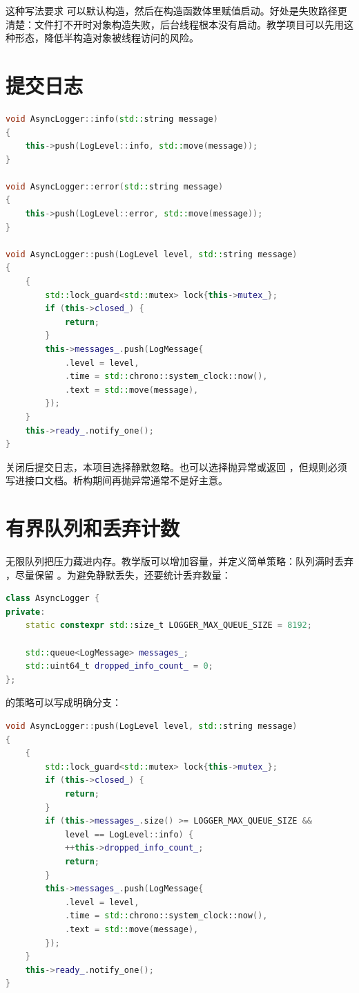 这种写法要求  可以默认构造，然后在构造函数体里赋值启动。好处是失败路径更清楚：文件打不开时对象构造失败，后台线程根本没有启动。教学项目可以先用这种形态，降低半构造对象被线程访问的风险。

\section{提交日志}

\begin{lstlisting}[language=C++,caption={提交日志消息}]
void AsyncLogger::info(std::string message)
{
    this->push(LogLevel::info, std::move(message));
}

void AsyncLogger::error(std::string message)
{
    this->push(LogLevel::error, std::move(message));
}

void AsyncLogger::push(LogLevel level, std::string message)
{
    {
        std::lock_guard<std::mutex> lock{this->mutex_};
        if (this->closed_) {
            return;
        }
        this->messages_.push(LogMessage{
            .level = level,
            .time = std::chrono::system_clock::now(),
            .text = std::move(message),
        });
    }
    this->ready_.notify_one();
}
\end{lstlisting}

关闭后提交日志，本项目选择静默忽略。也可以选择抛异常或返回 ，但规则必须写进接口文档。析构期间再抛异常通常不是好主意。

\section{有界队列和丢弃计数}

无限队列把压力藏进内存。教学版可以增加容量，并定义简单策略：队列满时丢弃 ，尽量保留 。为避免静默丢失，还要统计丢弃数量：

\begin{lstlisting}[language=C++,caption={带容量和丢弃计数的状态}]
class AsyncLogger {
private:
    static constexpr std::size_t LOGGER_MAX_QUEUE_SIZE = 8192;

    std::queue<LogMessage> messages_;
    std::uint64_t dropped_info_count_ = 0;
};
\end{lstlisting}

 的策略可以写成明确分支：

\begin{lstlisting}[language=C++,caption={队列满时丢弃 info}]
void AsyncLogger::push(LogLevel level, std::string message)
{
    {
        std::lock_guard<std::mutex> lock{this->mutex_};
        if (this->closed_) {
            return;
        }
        if (this->messages_.size() >= LOGGER_MAX_QUEUE_SIZE &&
            level == LogLevel::info) {
            ++this->dropped_info_count_;
            return;
        }
        this->messages_.push(LogMessage{
            .level = level,
            .time = std::chrono::system_clock::now(),
            .text = std::move(message),
        });
    }
    this->ready_.notify_one();
}
\end{lstlisting}

